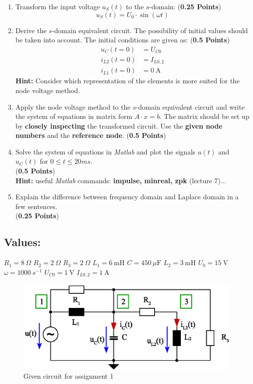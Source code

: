 \documentclass[a4paper]{article}
\begin{document}
	\begin{enumerate}
		\item Transform the input voltage $u_S(t)$ to the $s$-domain: (\textbf{0.25 Points})
		\begin{equation*}
		u_S(t)= U_0 \cdot \sin(\omega t)
		\end{equation*}
		\item Derive the $s$-domain equivalent circuit. The possibility of initial values should be taken into account. The initial conditions are given as: (\textbf{0.5 Points}) 		
		\begin{align*}
			u_{C}(t=0) &= U_{C0}\\
			i_{L2}(t=0) &= I_{L0,2}\\
			i_{L1}(t=0) &= 0~\text{A}
		\end{align*}
		\textbf{ Hint:} Consider which representation of the elements is more suited for the node voltage method.
		\item Apply the node voltage method to the $s$-domain equivalent circuit and write the system of equations in matrix form $A\cdot x = b$. The matrix should be set up by \textbf{closely inspecting} the transformed circuit. Use the \textbf{given node numbers} and the \textbf{reference node}. (\textbf{0.5 Points})
		\item Solve the system of equations in \textit{Matlab} and plot the signals $u(t)$ and $u_C(t)$ for $0\leq t\leq 20ms$. \\(\textbf{0.5 Points}) \\
		\textbf{Hint:} useful \textit{Matlab} commands: \textbf{impulse, minreal, zpk} (lecture 7)...
		\item Explain the difference between frequency domain and Laplace domain in a few sentences.\\(\textbf{0.25 Points})
	\end{enumerate}
\pagebreak
\subsection*{Values:}
$R_1 = 8~\Omega$ \qquad $R_2 = 2~\Omega$ \qquad $R_3 = 2~\Omega$ \qquad $L_1=6~\text{mH}$ \qquad $C=450~\mu\text{F}$ \qquad $L_2=3~\text{mH}$ \qquad $U_0 = 15~\text{V}$ \qquad $\omega = 1000~s^{-1}$ \qquad
$U_{C0} = 1~\text{V}$ \qquad $I_{L0,2} = 1~\text{A}$ \\


 \begin{figure}[h!]
	\centering
		\includegraphics[scale=0.8]{Figures/homework8_circuit_1.eps}
		\caption{Given circuit for assignment 1}
		\label{fig:ass_1}
\end{figure}
\end{document}
